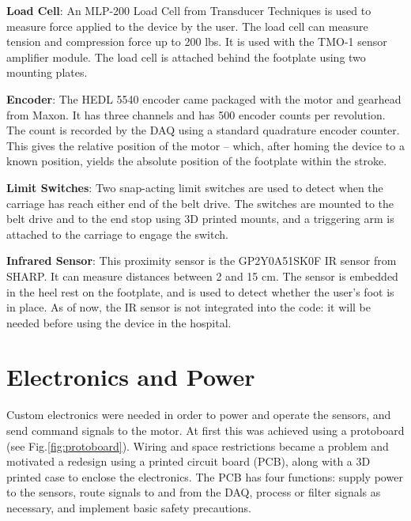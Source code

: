 \documentclass[12pt]{report}
\begin{document}
	\textbf{Load Cell}: An MLP-200 Load Cell from Transducer Techniques is used to measure force applied to the device by the user. The load cell can measure tension and compression force up to 200 lbs. It is used with the TMO-1 sensor amplifier module. The load cell is attached behind the footplate using two mounting plates. 
	
	\textbf{Encoder}: The HEDL 5540 encoder came packaged with the motor and gearhead from Maxon. It has three channels and has 500 encoder counts per revolution. The count is recorded by the DAQ using a standard quadrature encoder counter. This gives the relative position of the motor -- which, after homing the device to a known position, yields the absolute position of the footplate within the stroke. 
	
	\textbf{Limit Switches}: Two snap-acting limit switches are used to detect when the carriage has reach either end of the belt drive. The switches are mounted to the belt drive and to the end stop using 3D printed mounts, and a triggering arm is attached to the carriage to engage the switch. 
	
	\textbf{Infrared Sensor}: This proximity sensor is the GP2Y0A51SK0F IR sensor from SHARP. It can measure distances between 2 and 15 cm. The sensor is embedded in the heel rest on the footplate, and is used to detect whether the user's foot is in place. As of now, the IR sensor is not integrated into the code: it will be needed before using the device in the hospital.
	
	
		
	\section{Electronics and Power}
	
	Custom electronics were needed in order to power and operate the sensors, and send command signals to the motor. At first this was achieved using a protoboard (see Fig.\ref{fig:protoboard}). Wiring and space restrictions became a problem and motivated a redesign using a printed circuit board (PCB), along with a 3D printed case to enclose the electronics. The PCB has four functions: supply power to the sensors, route signals to and from the DAQ, process or filter signals as necessary, and implement basic safety precautions. 
	
\end{document}
